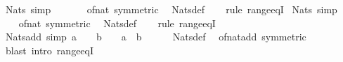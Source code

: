 \begin{isabellebody}
\endisatagproof
{\isafoldproof}%
%
\isadelimproof
\isanewline
%
\endisadelimproof
\isanewline
{}\isamarkupfalse%
\ Nats{\isacharunderscore}{\kern0pt}{}\ {\isacharbrackleft}{\kern0pt}simp{\isacharbrackright}{\kern0pt}{\isacharcolon}{\kern0pt}\ {\isachardoublequoteopen}{}\ {\isasymin}\ {\isasymnat}{\isachardoublequoteclose}\isanewline
%
\isadelimproof
\ \ %
\endisadelimproof
%
\isatagproof
{}\isamarkupfalse%
\ of{\isacharunderscore}{\kern0pt}nat{\isacharunderscore}{\kern0pt}{}\ {\isacharbrackleft}{\kern0pt}symmetric{\isacharbrackright}{\kern0pt}\ \isamarkupfalse%
\ Nats{\isacharunderscore}{\kern0pt}def\isanewline
\ \ \isamarkupfalse%
\ {\isacharparenleft}{\kern0pt}rule\ range{\isacharunderscore}{\kern0pt}eqI{\isacharparenright}{\kern0pt}%
\endisatagproof
{\isafoldproof}%
%
\isadelimproof
\isanewline
%
\endisadelimproof
\isanewline
{}\isamarkupfalse%
\ Nats{\isacharunderscore}{\kern0pt}{}\ {\isacharbrackleft}{\kern0pt}simp{\isacharbrackright}{\kern0pt}{\isacharcolon}{\kern0pt}\ {\isachardoublequoteopen}{}\ {\isasymin}\ {\isasymnat}{\isachardoublequoteclose}\isanewline
%
\isadelimproof
\ \ %
\endisadelimproof
%
\isatagproof
{}\isamarkupfalse%
\ of{\isacharunderscore}{\kern0pt}nat{\isacharunderscore}{\kern0pt}{}\ {\isacharbrackleft}{\kern0pt}symmetric{\isacharbrackright}{\kern0pt}\ \isamarkupfalse%
\ Nats{\isacharunderscore}{\kern0pt}def\isanewline
\ \ \isamarkupfalse%
\ {\isacharparenleft}{\kern0pt}rule\ range{\isacharunderscore}{\kern0pt}eqI{\isacharparenright}{\kern0pt}%
\endisatagproof
{\isafoldproof}%
%
\isadelimproof
\isanewline
%
\endisadelimproof
\isanewline
{}\isamarkupfalse%
\ Nats{\isacharunderscore}{\kern0pt}add\ {\isacharbrackleft}{\kern0pt}simp{\isacharbrackright}{\kern0pt}{\isacharcolon}{\kern0pt}\ {\isachardoublequoteopen}a\ {\isasymin}\ {\isasymnat}\ {\isasymLongrightarrow}\ b\ {\isasymin}\ {\isasymnat}\ {\isasymLongrightarrow}\ a\ {\isacharplus}{\kern0pt}\ b\ {\isasymin}\ {\isasymnat}{\isachardoublequoteclose}\isanewline
%
\isadelimproof
\ \ %
\endisadelimproof
%
\isatagproof
{}\isamarkupfalse%
\ Nats{\isacharunderscore}{\kern0pt}def\ \isamarkupfalse%
\ of{\isacharunderscore}{\kern0pt}nat{\isacharunderscore}{\kern0pt}add\ {\isacharbrackleft}{\kern0pt}symmetric{\isacharbrackright}{\kern0pt}\isanewline
\ \ \isamarkupfalse%
\ {\isacharparenleft}{\kern0pt}blast\ intro{\isacharcolon}{\kern0pt}\ range{\isacharunderscore}{\kern0pt}eqI{\isacharparenright}{\kern0pt}%

\end{isabellebody}
